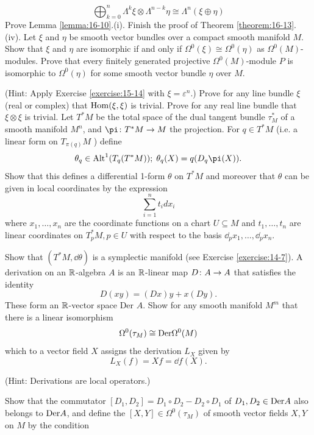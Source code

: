 \begin{enumerate}[\theexercise.1]
    \[
      \bigoplus_{k = 0}^n{\Lambda }^{k}\xi  \otimes  {\Lambda }^{n- k}\eta  \cong  {\Lambda }^{n}( {\xi  \oplus  \eta })
    \]
  \NewItem Prove Lemma \ref{lemma:16-10}.(i).
    \NewItem Finish the proof of Theorem \ref{theorem:16-13}.(iv).
  \NewItem Let $\xi$ and $\eta$ be smooth vector bundles over a compact smooth manifold $M$. Show that $\xi$ and $\eta$ are isomorphic if and only if ${\Omega }^{0}( \xi )  \cong  {\Omega }^{0}( \eta )$ as ${\Omega }^{0}( M)$- modules. Prove that every finitely generated projective ${\Omega }^{0}( M)$-module $P$ is isomorphic to ${\Omega }^{0}( \eta )$ for some smooth vector bundle $\eta$ over $M$.
    \par(Hint: Apply Exercise \ref{exercise:15-14} with $\xi  = {\varepsilon }^{n}$.)
  \NewItem Prove for any line bundle $\xi$ (real or complex) that $\mathrm{Hom}( {\xi,\xi })$ is trivial. Prove for any real line bundle that $\xi  \otimes  \xi$ is trivial.
  \NewItem Let ${T}^*M$ be the total space of the dual tangent bundle ${\tau }_{M}^*$ of a smooth manifold ${M}^{n}$, and $\pi\colon  {T}^*M \ra  M$ the projection. For $q \in  {T}^*M$ (i.e. a linear form on ${T}_{\pi ( q) }M$ ) define
    \[
      {\theta }_{q} \in  {\alt}^{1}( {{T}_{q}( {{T}^*M}) });\;{\theta }_{q}( X)  = q( {{D}_{q}\pi ( X) }).
    \]
    Show that this defines a differential 1-form $\theta$ on ${T}^*M$ and moreover that $\theta$ can be given in local coordinates by the expression
    \[
      \sum_{i=1}^{n}{t}_{i}d{x}_{i}
    \]
    where ${x}_{1},\ldots,{x}_{n}$ are the coordinate functions on a chart $U \subseteq  M$ and ${t}_{1},\ldots,{t}_{n}$ are linear coordinates on ${T}_{p}^*M,p \in  U$ with respect to the basis ${\dd}_{p}{x}_{1},\ldots,{\dd}_{p}{x}_{n}$.\par
    Show that $( {{T}^*M,{\dd\theta }})$ is a symplectic manifold (see Exercise \ref{exercise:14-7}).
  \newchap[17]
  \NewItem A derivation on an $\mathbb{R}$-algebra $A$ is an $\mathbb{R}$-linear map $D\colon A \rightarrow  A$ that satisfies the identity
    \[
      D( {xy})  = ( {Dx}) y + x( {Dy}).
    \]
    These form an $\mathbb{R}$-vector space Der $A$. Show for any smooth manifold ${M}^{m}$ that there is a linear isomorphism
    \[
      {\Omega }^{0}( {\tau }_{M})  \cong  \mathrm{Der}{\Omega }^{0}( M)
    \]
    which to a vector field $X$ assigns the derivation ${L}_{X}$ given by
    \[
      {L}_{X}( f)  = {Xf} = {\dd f}( X).
    \]
    \par(Hint: Derivations are local operators.)\par
    Show that the commutator $[  {{D}_{1},{D}_{2}}]   = {D}_{1} \circ  {D}_{2}- {D}_{2} \circ  {D}_{1}$ of ${D}_{1},{D}_{2} \in  \mathrm{Der}A$ also belongs to $\mathrm{Der}A$, and define the  $[  {X,Y}]   \in  {\Omega }^{0}( {\tau }_{M})$ of smooth vector fields $X,Y$ on $M$ by the condition

\end{enumerate}
